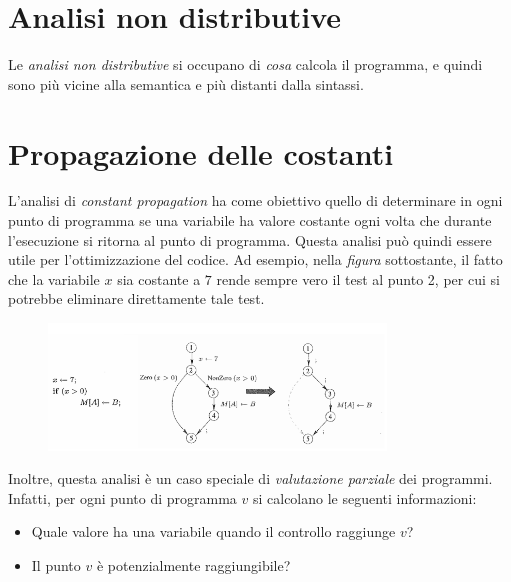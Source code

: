 \documentclass[a4paper,oneside,titlepage]{book}
\begin{document}
\section{Analisi non distributive}
Le \textit{analisi non distributive} si occupano di \textit{cosa} calcola il programma, e quindi sono più vicine alla semantica e più distanti dalla sintassi.

\section{Propagazione delle costanti} %
\label{const1}
L'analisi di \textit{constant propagation} ha come obiettivo quello di determinare in ogni punto di programma se una variabile ha valore costante ogni volta che durante l'esecuzione si ritorna al punto di programma. Questa analisi può quindi essere utile per l'ottimizzazione del codice. Ad esempio, nella \textit{figura} sottostante, il fatto che la variabile $x$ sia costante a $7$ rende sempre vero il test al punto 2, per cui si potrebbe eliminare direttamente tale test.
\begin{figure}[htp]
	\centering
	\includegraphics[width=0.8\textwidth]{const1.png}
\end{figure}

\noindent
Inoltre, questa analisi è un caso speciale di \textit{valutazione parziale} dei programmi. Infatti, per ogni punto di programma $v$ si calcolano le seguenti informazioni:
\begin{itemize}
    \item Quale valore ha una variabile quando il controllo raggiunge $v$?
    \item Il punto $v$ è potenzialmente raggiungibile?
\end{itemize}
\end{document}
